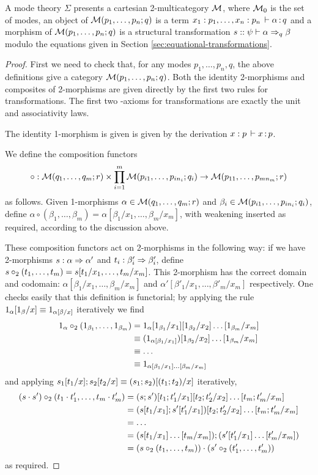 \begin{theorem}
\label{thm:completeness-mode-theory}
A mode theory $\Sigma$ presents a cartesian 2-multicategory $\mathcal{M}$, where
$\mathcal{M}_0$ is the set of modes, an object of $\mathcal{M}(p_1,\ldots,p_n;q)$ is a
term $x_1:p_1,\ldots,x_n:p_n \, \vdash \alpha \, \mathit{:} \, q$ and a morphism of $\mathcal{M}(p_1,\ldots,p_n;q)$ is a structural transformation
$s :: \psi \vdash \alpha \Rightarrow_{q} \beta$ modulo the equations given in Section \ref{sec:equational-transformations}.  
\end{theorem}
\begin{proof}
First we need to check that, for any modes $p_1, \dots, p_n, q$, the above definitions give a category $\mathcal{M}(p_1,\ldots,p_n;q)$. Both the identity 2-morphisms and composites of 2-morphisms are given directly by the first two rules for transformations. The first two \deq-axioms for transformations are exactly the unit and associativity laws.

The identity 1-morphism is given is given by the derivation $x : p \, \vdash x \, \mathit{:} \, p$.

We define the composition functors
\[ \circ : \mathcal{M}(q_1, \dots, q_m; r) \times \prod_{i=1}^m \mathcal{M}(p_{i1},\dots,p_{in_i};q_i) \rightarrow \mathcal{M}(p_{11},\dots,p_{mn_m};r) \]
as follows. Given 1-morphisms $\alpha \in \mathcal{M}(q_1, \dots, q_m; r)$ and $\beta_i \in \mathcal{M}(p_{i1},\dots,p_{in_i};q_i)$, define $\alpha \circ (\beta_1, \dots, \beta_m) = \alpha[\beta_1/x_1, \dots, \beta_m / x_m]$, with weakening inserted as required, according to the discussion above.

These composition functors act on 2-morphisms in the following way: if we have 2-morphisms $s : \alpha \Rightarrow \alpha'$ and $t_i : \beta_i' \Rightarrow \beta_i'$, define $s \mathbin{\circ_2} (t_1, \dots, t_m) = s[t_1/x_1, \dots, t_m/x_m]$. This 2-morphism has the correct domain and codomain: $\alpha[\beta_1/x_1, \dots, \beta_m / x_m]$ and $\alpha'[\beta'_1/x_1, \dots, \beta'_m / x_m]$ respectively. One checks easily that this definition is functorial; by applying the rule $1_\alpha[1_\beta/x] \equiv 1_{\alpha[\beta/x]}$ iteratively we find
\begin{align*}
1_\alpha \mathbin{\circ_2} (1_{\beta_1}, \dots, 1_{\beta_m}) 
&= 1_\alpha[1_{\beta_1}/x_1][1_{\beta_2}/x_2]\dots[1_{\beta_m}/x_m] \\
&\equiv (1_{\alpha[\beta_1/x_1]})[1_{\beta_2}/x_2]\dots[1_{\beta_m}/x_m] \\
&\equiv \dots \\
&\equiv 1_{\alpha[\beta_1/x_1] \dots [\beta_m / x_m]}
\end{align*}
and applying $s_1[t_1/x];s_2[t_2/x] \equiv (s_1;s_2)[(t_1;t_2)/x]$ iteratively,
\begin{align*}
(s \cdot s') \mathbin{\circ_2} (t_1 \cdot t_1', \dots, t_m \cdot t_m')
&= (s;s')[t_1;t_1'/x_1][t_2;t_2'/x_2]\dots[t_m;t_m'/x_m] \\ 
&= (s[t_1/x_1];s'[t_1'/x_1])[t_2;t_2'/x_2]\dots[t_m;t_m'/x_m] \\
&= \dots \\
&= (s[t_1/x_1]\dots[t_m/x_m]);(s'[t'_1/x_1]\dots[t'_m/x_m]) \\
&= (s \mathbin{\circ_2} (t_1, \dots, t_m)) \cdot (s' \mathbin{\circ_2} (t'_1, \dots, t'_m))
\end{align*}
as required.


\end{proof}
